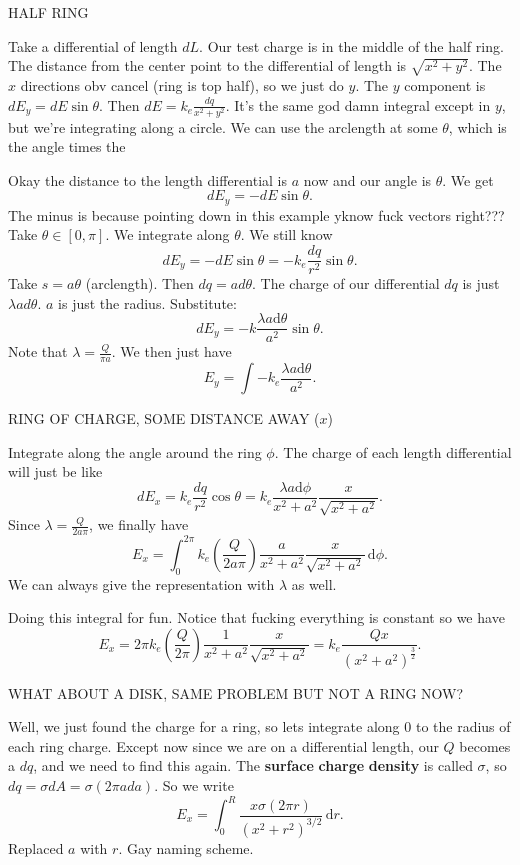 HALF RING

Take a differential of length $dL$. Our test charge is in the middle of the half ring. The distance from the center point to the differential of length is $\sqrt{x^2+y^2} $. The $x$ directions obv cancel (ring is top half), so we just do $y$. The $y$ component is $dE_y=dE\sin \theta $. Then $dE=k_e \frac{dq}{x^2+y^2}$. It's the same god damn integral except in $y$, but we're integrating along a circle. We can use the arclength at some $\theta $, which is the angle times the

Okay the distance to the length differential is $a$ now and our angle is $\theta $. We get
\[
	dE_y = -dE\sin \theta 
.\]
The minus is because pointing down in this example yknow fuck vectors right??? Take $\theta \in[0,\pi ]$. We integrate along $\theta $. We still know
\[
	dE_y = -dE\sin \theta =-k_e \frac{dq}{r^2}\sin \theta 
.\]
Take $s=a\theta $ (arclength). Then $dq=ad\theta $. The charge of our differential $dq$ is just $\lambda ad\theta $. $a$ is just the radius. Substitute:
\[
	dE_y = -k \frac{\lambda a \mathrm{d} \theta }{a^2}\sin \theta 
.\]
Note that $\lambda =\frac{Q}{\pi a}$. We then just have
\[
	E_y = \int -k_e \frac{\lambda a\mathrm{d} \theta }{a^2}
.\]

RING OF CHARGE, SOME DISTANCE AWAY ($x$)

Integrate along the angle around the ring $\phi $. The charge of each length differential will just be like
\[
	dE_x = k_e \frac{dq}{r^2}\cos \theta =k_e\frac{\lambda a\mathrm{d}\phi  }{x^2 + a^2} \frac{x}{\sqrt{x^2+a^2}}
.\]
Since $\lambda =\frac{Q}{2a\pi }$, we finally have
\[
	E_x = \int_{0}^{2\pi } k_e\left( \frac{Q}{2a\pi } \right) \frac{a}{x^2+a^2}\frac{x}{\sqrt{x^2+a^2} } \,\mathrm{d} \phi 
.\]
We can always give the representation with $\lambda $ as well.

Doing this integral for fun. Notice that fucking everything is constant so we have
\[
	E_x = 2\pi k_e\left( \frac{Q}{2\pi } \right) \frac{1}{x^2+a^2}\frac{x}{\sqrt{x^2+a^2} }=k_e \frac{Qx}{\left( x^2+a^2 \right) ^\frac{3}{2}}
.\]

WHAT ABOUT A DISK, SAME PROBLEM BUT NOT A RING NOW?

Well, we just found the charge for a ring, so lets integrate along 0 to the radius of each ring charge. Except now since we are on a differential length, our $Q$ becomes a $dq$, and we need to find this again. The \textbf{surface} \textbf{charge} \textbf{density} is called $\sigma $, so  $dq=\sigma dA=\sigma (2\pi ada)$. So we write
\[
	E_x = \int_{0}^{R} \frac{x\sigma \left( 2\pi r \right) }{(x^2 + r^2)^{3/2}} \,\mathrm{d} r
.\]
Replaced $a$ with $r$. Gay naming scheme.
